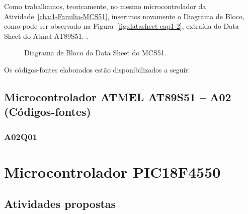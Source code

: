 \documentclass[
	12pt,				%
	openright,			%
  oneside,     %
	a4paper,			%
	english,			%
	french,				%
	spanish,			%
	brazil				%
	]{abntex2}
\begin{document}
Como trabalhamos, teoricamente, no mesmo microcontrolador da Atividade~\ref{cha:1-Familia-MCS51}, inserimos novamente o Diagrama de Bloco, como pode ser observado na Figura~\ref{fig:datasheet-cap1-2}, extraída do Data Sheet do Atmel AT89S51. \cite{Corporation2000}.

\newpage

  \begin{figure}[H]
    \centering
    
    \caption{\label{fig:datasheet-cap1-2-2}Diagrama de Bloco do Data Sheet do MCS51.}
  \end{figure}

\newpage

Os códigos-fontes elaborados estão disponibilizados a seguir:

\section*{Microcontrolador ATMEL AT89S51 -- A02 (Códigos-fontes)}
\subsection*{A02Q01}



















%
%

\chapter{Microcontrolador PIC18F4550}%
\label{cha:3-PIC}

\section{Atividades propostas} %
\label{cha:PIC-sec:atividades_propostas}
\end{document}
